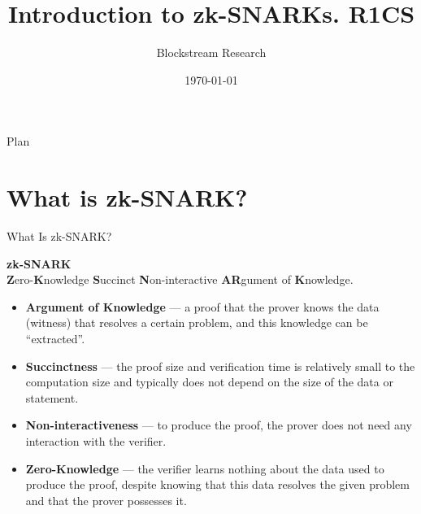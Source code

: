 \documentclass{zkdl-presentation-template}
\title[zk-SNARK: Part I]{\textbf{Introduction to zk-SNARKs. R1CS}}
\author{Blockstream Research}
\date{\today}
\begin{document}
    \maketitleframe

    \begin{frame}{Plan}
        \tableofcontents
    \end{frame}

    \section{What is zk-SNARK?}

    \begin{frame}{What Is zk-SNARK?}
        \begin{definition}
            \begin{center}
                \textbf{zk-SNARK} \\
                \small\textbf{Z}ero-\textbf{K}nowledge \textbf{S}uccinct \textbf{N}on-interactive \textbf{AR}gument of \textbf{K}nowledge.
            \end{center}
        \end{definition}

        \pause

        \begin{itemize}
            \item \textbf{Argument of Knowledge} --- a proof that the prover knows the data (witness) that resolves a certain
            problem, and this knowledge can be ``extracted''. \pause
            \item \textbf{Succinctness} --- the proof size and verification time is relatively small to the computation size and typically does not depend on the size of 
            the data or statement. \pause
            \item \textbf{Non-interactiveness} --- to produce the proof, the prover does not need any interaction
            with the verifier. \pause
            \item \textbf{Zero-Knowledge} --- the verifier learns nothing about the data used to produce the
            proof, despite knowing that this data resolves the given problem and that the prover possesses it.
        \end{itemize}
    \end{frame}
\end{document}
